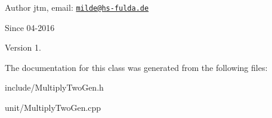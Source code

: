 \begin{DoxyAuthor}{Author}
jtm, email\-:  \href{mailto:milde@hs-fulda.de}{\tt milde@hs-\/fulda.\-de} 
\end{DoxyAuthor}
\begin{DoxySince}{Since}
04-\/2016 
\end{DoxySince}
\begin{DoxyVersion}{Version}
1. 
\end{DoxyVersion}


The documentation for this class was generated from the following files\-:\begin{DoxyCompactItemize}
\item 
include/Multiply\-Two\-Gen.\-h\item 
unit/Multiply\-Two\-Gen.\-cpp\end{DoxyCompactItemize}
